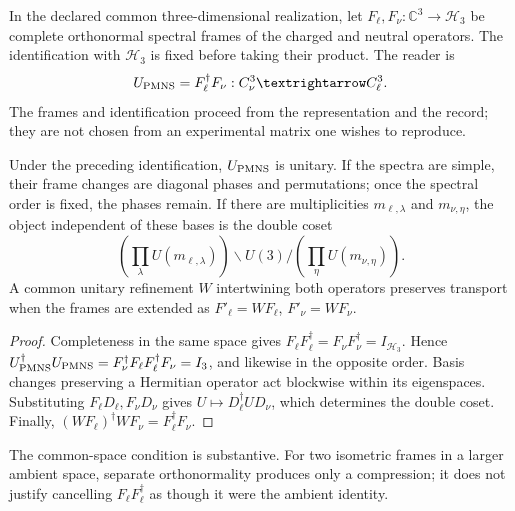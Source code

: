 \begin{definition}
In the declared common three-dimensional realization, let \(F_\ell,F_\nu:\mathbb C^3\to\mathcal H_3\) be complete orthonormal spectral frames of the charged and neutral operators. The identification with \(\mathcal H_3\) is fixed before taking their product. The reader is
\begin{equation}
 U_{\rm PMNS}=F_\ell^\dagger F_\nu:
 \mathbb C^3_\nu\longrightarrow\mathbb C^3_\ell.
 \label{ii:eq:ii-pmns-frames}
\end{equation}
The frames and identification proceed from the representation and the record; they are not chosen from an experimental matrix one wishes to reproduce.
\end{definition}

\begin{theorem}
Under the preceding identification, \(U_{\rm PMNS}\) is unitary. If the spectra are simple, their frame changes are diagonal phases and permutations; once the spectral order is fixed, the phases remain. If there are multiplicities \(m_{\ell,\lambda}\) and \(m_{\nu,\eta}\), the object independent of these bases is the double coset
\begin{equation}
 \left(\prod_\lambda U(m_{\ell,\lambda})\right)
 \backslash U(3) /
 \left(\prod_\eta U(m_{\nu,\eta})\right).
 \label{ii:eq:ii-pmns-double-class}
\end{equation}
A common unitary refinement \(W\) intertwining both operators preserves transport when the frames are extended as \(F'_\ell=WF_\ell\), \(F'_\nu=WF_\nu\).
\end{theorem}

\begin{proof}
Completeness in the same space gives \(F_\ell F_\ell^\dagger=F_\nu F_\nu^\dagger=I_{\mathcal H_3}\). Hence \(U_{\rm PMNS}^\dagger U_{\rm PMNS}
=F_\nu^\dagger F_\ell F_\ell^\dagger F_\nu=I_3\), and likewise in the opposite order. Basis changes preserving a Hermitian operator act blockwise within its eigenspaces. Substituting \(F_\ell D_\ell,F_\nu D_\nu\) gives \(U\mapsto D_\ell^\dagger UD_\nu\), which determines the double coset. Finally, \((WF_\ell)^\dagger WF_\nu=F_\ell^\dagger F_\nu\).
\end{proof}

The common-space condition is substantive. For two isometric frames in a larger ambient space, separate orthonormality produces only a compression; it does not justify cancelling \(F_\ell F_\ell^\dagger\) as though it were the ambient identity.

